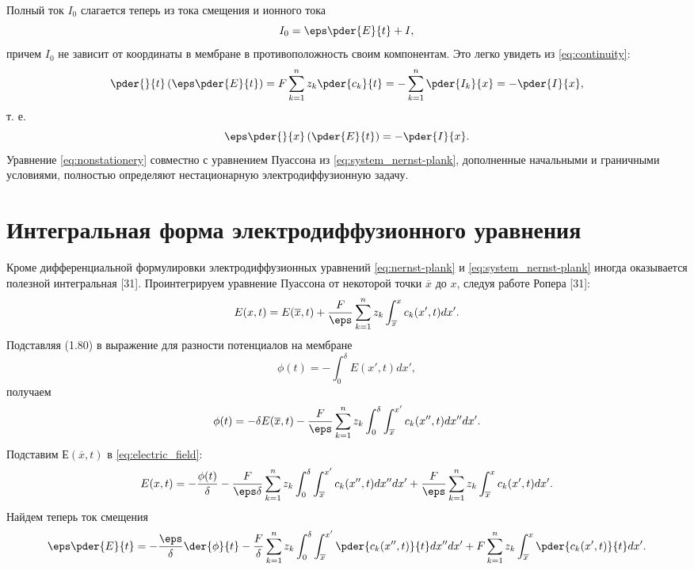 Полный ток \( I_0 \) слагается теперь из тока смещения и ионного тока
\begin{equation}
    I_0 = \eps\pder{E}{t} + I,
\end{equation}
причем \( I_0 \) не зависит от координаты в мембране в противоположность своим
компонентам. Это легко увидеть из \eqref{eq:continuity}:
\[
    \pder{}{t}\left(\eps\pder{E}{t}\right) = F\sum_{k=1}^n z_k \pder{c_k}{t} =
    -\sum_{k=1}^n\pder{I_k}{x} = -\pder{I}{x},
\]
т. е.
\[
    \eps\pder{}{x}\left(\pder{E}{t}\right) = -\pder{I}{x}.
\]
Уравнение \eqref{eq:nonstationery} совместно с уравнением Пуассона из
\eqref{eq:system_nernst-plank}, дополненные начальными и граничными условиями,
полностью определяют нестационарную электродиффузионную задачу.

\section{Интегральная форма электродиффузионного уравнения}
Кроме дифференциальной формулировки электродиффузионных уравнений
\eqref{eq:nernst-plank} и \eqref{eq:system_nernst-plank} иногда оказывается
полезной интегральная [31]. Проинтегрируем уравнение Пуассона от некоторой точки
\( \overline{x} \) до \( x \), следуя работе Ропера [31]:
\begin{equation}
    E(x, t) = E(\overline{x}, t) + \frac{F}{\eps}\sum_{k=1}^n z_k
    \int_{\overline{x}}^x c_k(x', t) dx'.
    \label{eq:electric_field}
\end{equation}
Подставляя (1.80) в выражение для разности потенциалов на мембране
\begin{equation}
    \phi(t) = -\int_0^\delta E(x', t) dx',
\end{equation}
получаем
\begin{equation}
    \phi(t) = -\delta E(\overline{x}, t) - \frac{F}{\eps}\sum_{k=1}^n z_k
    \int_0^\delta \int_{\overline{x}}^{x'} c_k(x'', t) dx'' dx'.
\end{equation}
Подставим \(Е(\overline{x}, t)\) в \eqref{eq:electric_field}:
\begin{equation}
    E(x, t) = -\frac{\phi(t)}{\delta} -
    \frac{F}{\eps\delta}\sum_{k=1}^n z_k
    \int_0^\delta \int_{\overline{x}}^{x'} c_k(x'', t) dx'' dx' +
    \frac{F}{\eps}\sum_{k=1}^n z_k\int_{\overline{x}}^x c_k(x', t) dx'.
\end{equation}
Найдем теперь ток смещения
\begin{equation}
    \eps\pder{E}{t} = -\frac{\eps}{\delta}\der{\phi}{t} -
    \frac{F}{\delta}\sum_{k=1}^n z_k
    \int_0^\delta \int_{\overline{x}}^{x'} \pder{c_k(x'', t)}{t} dx'' dx' +
    F\sum_{k=1}^n z_k\int_{\overline{x}}^x \pder{c_k(x', t)}{t} dx'.
\end{equation}
